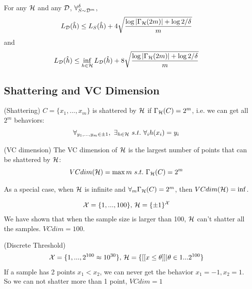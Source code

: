 \documentclass{article}
\begin{document}
For any $\mathcal{H}$ and any $\mathcal{D}$, $\forall^\delta_{S\sim\mathcal{D}^m}$,
\begin{displaymath}
  L_{\mathcal{D}}(\hat{h}) \leq L_S(\hat{h}) + 4\sqrt{\frac{\log{|\Gamma_{\mathcal{H}}(2m)|}+\log{2/\delta}}{m}}
\end{displaymath}
and
\begin{displaymath}
  L_{\mathcal{D}}(\hat{h}) \leq \inf_{h\in \mathcal{H}}L_{\mathcal{D}}(\hat{h}) + 8\sqrt{\frac{\log{|\Gamma_{\mathcal{H}}(2m)|}+\log{2/\delta}}{m}}
\end{displaymath}

\subsection{Shattering and VC Dimension}
\begin{defn}(Shattering) $C=\{x_1, ...,x_m\}$ is shattered by $\mathcal{H}$ if $\Gamma_{\mathcal{H}}(C)=2^m$, i.e. we can get all $2^m$ behaviors:
\begin{displaymath}
  \forall_{y_1,...,y_m\in \pm1},\ \exists_{h\in \mcH} \ s.t.\ \forall_{i}h(x_i)=y_i
\end{displaymath}
\end{defn}

\begin{defn}(VC dimension) The VC dimension of $\mathcal{H}$ is the largest number of points that can be shattered by $\mathcal{H}$:
\begin{displaymath}
  VCdim(\mcH)=\max m \ s.t.\ \Gamma_\mcH(C)=2^m
\end{displaymath}
\end{defn}

\begin{example}
As a special case, when $\mathcal{H}$ is infinite and $\forall_m \Gamma_{\mathcal{H}}(C)=2^m$, then $VCdim(\mathcal{H})=\inf$.
\end{example}

\begin{example}
  \begin{displaymath}
	\mathcal{X}=\{1,...,100\},\,\mathcal{H}=\{\pm1\}^{\mathcal{X}} 
  \end{displaymath}
  We have shown that when the sample size is larger than 100, $\mathcal{H}$ can't shatter all the samples. $VCdim=100$.
\end{example}

\begin{example}(Discrete Threshold)
  \begin{displaymath}
	\mathcal{X}=\{1,...,2^{100}\approx 10^{30}\},\,\mathcal{H}=\{[[x\leq \theta]]|\theta\in 1...2^{100}\}
  \end{displaymath}
  If a sample has 2 points $x_1<x_2$, we can never get the behavior $x_1=-1, x_2=1$. So we can not shatter more than 1 point, $VCdim=1$
\end{example}
\end{document}
